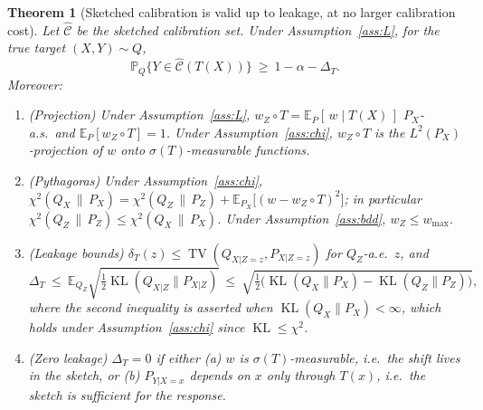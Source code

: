 \documentclass[11pt,a4paper]{article}
\newcommand{\PX}{P_X}
\newcommand{\QX}{Q_X}
\newcommand{\chisq}{\chi^2(\QX\,\|\,\PX)}
\newcommand{\chisqZ}{\chi^2(Q_Z\,\|\,P_Z)}
\newcommand{\E}{\mathbb{E}}
\newcommand{\Prob}{\mathbb{P}}
\newcommand{\TV}{\operatorname{TV}}
\newcommand{\KL}{\operatorname{KL}}
\newcommand{\Cset}{\widehat{\mathcal C}}
\theoremstyle{plain}
\newtheorem{theorem}{Theorem}[section]
\theoremstyle{definition}
\theoremstyle{remark}
\begin{document}
\begin{theorem}[Sketched calibration is valid up to leakage, at no larger calibration cost]\label{prop:main}
Let $\Cset$ be the sketched calibration set. Under Assumption~\ref{ass:L}, for the true target $(X,Y)\sim Q$,
\begin{equation}\label{eq:val}
\Prob_Q\bigl\{Y\in\Cset(T(X))\bigr\}\ \ge\ 1-\alpha-\Delta_T .
\end{equation}
Moreover:
\begin{enumerate}[leftmargin=1.8em,itemsep=1pt]
\item[(i)] (Projection) Under Assumption~\ref{ass:L}, $w_Z\circ T=\E_P[\,w\mid T(X)\,]$ $\PX$-a.s.\ and $\E_P[w_Z\circ T]=1$. Under Assumption~\ref{ass:chi}, $w_Z\circ T$ is the $L^2(\PX)$-projection of $w$ onto $\sigma(T)$-measurable functions.
\item[(ii)] (Pythagoras) Under Assumption~\ref{ass:chi}, $\chisq=\chisqZ+\E_{\PX}\bigl[(w-w_Z\circ T)^2\bigr]$; in particular $\chisqZ\le\chisq$. Under Assumption~\ref{ass:bdd}, $w_Z\le w_{\max}$.
\item[(iii)] (Leakage bounds) $\delta_T(z)\le\TV(Q_{X|Z=z},P_{X|Z=z})$ for $Q_Z$-a.e.\ $z$, and
\[
\Delta_T\ \le\ \E_{Q_Z}\sqrt{\tfrac12\KL(Q_{X|Z}\|P_{X|Z})}\ \le\ \sqrt{\tfrac12\bigl(\KL(\QX\|\PX)-\KL(Q_Z\|P_Z)\bigr)} ,
\]
where the second inequality is asserted when $\KL(\QX\|\PX)<\infty$, which holds under Assumption~\ref{ass:chi} since $\KL\le\chi^2$.
\item[(iv)] (Zero leakage) $\Delta_T=0$ if either (a) $w$ is $\sigma(T)$-measurable, i.e.\ the shift lives in the sketch, or (b) $P_{Y|X=x}$ depends on $x$ only through $T(x)$, i.e.\ the sketch is sufficient for the response.
\end{enumerate}
\end{theorem}
\end{document}
